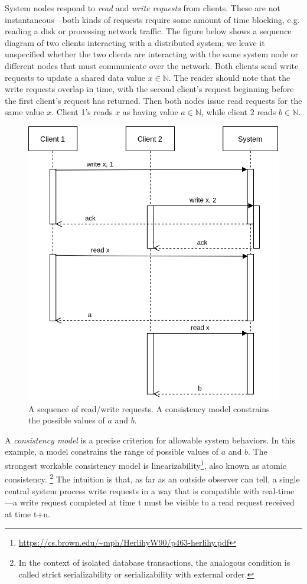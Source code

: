 System nodes respond to \emph{read} and \emph{write requests} from
clients. These are not instantaneous---both kinds of requests require
some amount of time blocking, e.g. reading a disk or processing
network traffic. The figure below shows a sequence diagram of two
clients interacting with a distributed system; we leave it unspecified
whether the two clients are interacting with the same system node or
different nodes that must communicate over the network. Both clients
send write requests to update a shared data value $x \in \mathbb{N}$.
The reader should note that the write requests overlap in time, with
the second client's request beginning before the first client's
request has returned. Then both nodes issue read requests for the same
value $x$. Client 1's reads $x$ as having value $a \in \mathbb{N}$,
while client 2 reads $b \in \mathbb{N}$.

\begin{figure}
  \includegraphics[scale=0.6]{Sequence Diagram.png}
  \caption{A sequence of read/write requests. A consistency model constrains the possible values of $a$ and $b$.}
\end{figure}

A \emph{consistency model} is a precise criterion for allowable system
behaviors. In this example, a model constrains the range of possible
values of $a$ and $b$. The strongest workable consistency model is
linearizability\footnote{\url{https://cs.brown.edu/~mph/HerlihyW90/p463-herlihy.pdf}},
also known as atomic consistency. \footnote{In the context of isolated
database transactions, the analogous condition is called strict
serializability or serializability with external order.} The intuition
is that, as far as an outside observer can tell, a single central
system process write requests in a way that is compatible with
real-time---a write request completed at time t must be visible to a
read request received at time t+n.

